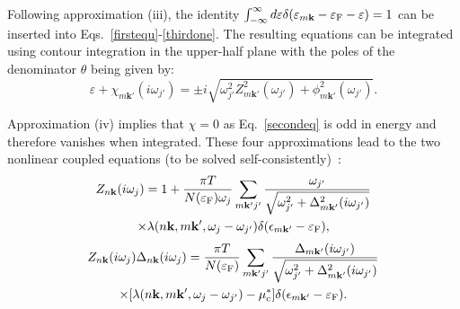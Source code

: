 \documentclass[final,3p,times,twocolumn]{elsarticle}
\begin{document}
Following approximation (iii), the identity $\int_{-\infty}^{\infty} d\varepsilon \delta(\varepsilon_{m\mathbf{k}}-\varepsilon_{\rm F} -\varepsilon)=1$ can be inserted into Eqs.~\eqref{firstequ}-\eqref{thirdone}. 
The resulting equations can be integrated using contour integration in the upper-half plane with the poles of the denominator $\theta$ being given by:
\begin{equation}
\varepsilon+\chi_{m\mathbf{k'}}(i\omega_{j'})= \pm i \sqrt{\omega_{j'}^2 Z_{m\mathbf{k'}}^2(\omega_{j'}) + \phi_{m\mathbf{k'}}^2(\omega_{j'})}.
\end{equation}

Approximation (iv) implies that $\chi = 0$ as Eq.~\eqref{secondeq} is odd in energy and therefore vanishes when integrated.
These four approximations lead to the two nonlinear coupled equations (to be solved self-consistently)~\cite{Choi2003,Margine2013}:  
\begin{multline}\label{coupledAnisoEqs1}
   Z_{n\mathbf{k}}(i\omega_j) =  1 + \frac{\pi T}{N(\varepsilon_{\rm F})\omega_j} \sum_{m\mathbf{k'}j'}  \frac{\omega_{j'}}{\sqrt{\omega_{j'}^2+\Delta_{m\mathbf{k'}}^2(i\omega_{j'})} }\\
   \times \lambda(n\mathbf{k},m\mathbf{k'},\omega_{j}-\omega_{j'})\delta(\epsilon_{m\mathbf{k'}}-\varepsilon_{\rm F}), 
\end{multline}                                      
\begin{multline}\label{coupledAnisoEqs2}
    Z_{n\mathbf{k}}(i\omega_j)\Delta_{n\mathbf{k}}(i\omega_{j}) = \frac{\pi T}{N(\varepsilon_{\rm F})}  \sum_{m\mathbf{k'}j'} \frac{\Delta_{m\mathbf{k'}}(i\omega_{j'})}{\sqrt{\omega_{j'}^2+\Delta_{m\mathbf{k'}}^2(i\omega_{j'})} } \\
   \times [\lambda(n\mathbf{k},m\mathbf{k'},\omega_j-\omega_{j'})-\mu_{\rm c}^*]\delta(\epsilon_{m\mathbf{k'}}-\varepsilon_{\rm F}).
\end{multline}          
\end{document}
